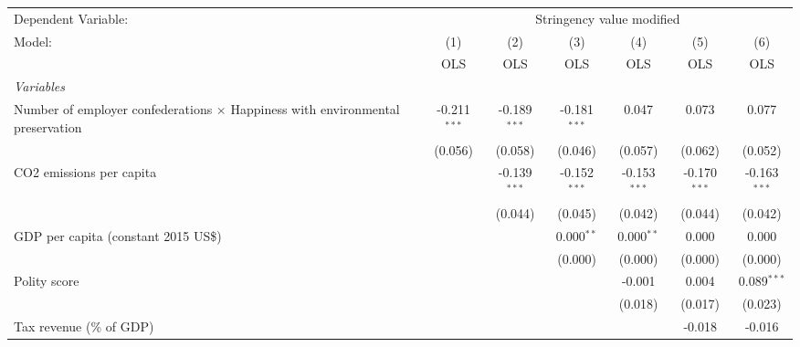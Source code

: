 
\begingroup
\centering
\begin{tabular}{lcccccc}
   \toprule
   Dependent Variable: & \multicolumn{6}{c}{Stringency value modified}\\
   Model:                                                                                & (1)            & (2)            & (3)            & (4)            & (5)            & (6)\\  
                                                                                         &  OLS           & OLS            & OLS            & OLS            & OLS            & OLS\\  
   \midrule
   \emph{Variables}\\
   Number of employer confederations $\times$ Happiness with environmental preservation  & -0.211$^{***}$ & -0.189$^{***}$ & -0.181$^{***}$ & 0.047          & 0.073          & 0.077\\   
                                                                                         & (0.056)        & (0.058)        & (0.046)        & (0.057)        & (0.062)        & (0.052)\\   
   CO2 emissions per capita                                                              &                & -0.139$^{***}$ & -0.152$^{***}$ & -0.153$^{***}$ & -0.170$^{***}$ & -0.163$^{***}$\\   
                                                                                         &                & (0.044)        & (0.045)        & (0.042)        & (0.044)        & (0.042)\\   
   GDP per capita (constant 2015 US\$)                                                   &                &                & 0.000$^{**}$   & 0.000$^{**}$   & 0.000          & 0.000\\   
                                                                                         &                &                & (0.000)        & (0.000)        & (0.000)        & (0.000)\\   
   Polity score                                                                          &                &                &                & -0.001         & 0.004          & 0.089$^{***}$\\   
                                                                                         &                &                &                & (0.018)        & (0.017)        & (0.023)\\   
   Tax revenue (\% of GDP)                                                               &                &                &                &                & -0.018         & -0.016\\   

\end{tabular}
